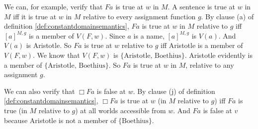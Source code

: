 We can, for example, verify that $Fa$ is true at $w$ in $M$. A sentence is true
at $w$ in $M$ iff it is true at $w$ in $M$ relative to every assignment function
$g$. By clause (a) of definition \ref{def:constantdomainsemantics}, $Fa$ is true
at $w$ in $M$ relative to $g$ iff $[a]^{M,g}$ is a member of $V(F,w)$. Since $a$
is a name, $[a]^{M,g}$ is $V(a)$. And $V(a)$ is Aristotle. So $Fa$ is true at
$w$ relative to $g$ iff Aristotle is a member of $V(F,w)$. We know that $V(F,w)$
is $\{ \text{Aristotle, Boethius} \}$. Aristotle evidently is a member of
$\{ \text{Aristotle, Boethius} \}$. So $Fa$ is true at $w$ in $M$, relative to
any assignment $g$.

We can also verify that $\Box Fa$ is false at $w$. By clause (j) of definition
\ref{def:constantdomainsemantics}, $\Box Fa$ is true at $w$ (in $M$ relative to
$g$) iff $Fa$ is true (in $M$ relative to $g$) at all worlds accessible from
$w$. And $Fa$ is false at $v$ because Aristotle is not a member of $\{ \text{Boethius} \}$.



